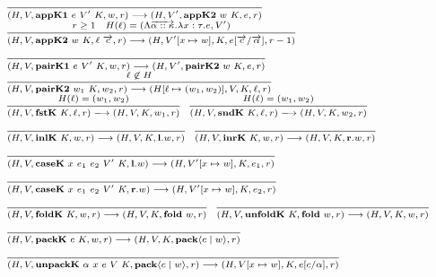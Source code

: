 \documentclass[fleqn]{article}
\begin{document}
\[
\scriptsize
\begin{array}{l}	
	\infer{(H,V,\mathbf{appK1}~e~V'~K,w,r) \longrightarrow (H,V',\mathbf{appK2}~w~K,e,r)}{\vspace{1em}} \\
	\infer{(H,V,\mathbf{appK2}~w~K,\ell~\overrightarrow{c},r) \longrightarrow (H,V'[x \mapsto w],K,e[\overrightarrow{c}/\overrightarrow{\alpha}],r-1)}{r \ge 1 & H(\ell) = (\Lambda \overrightarrow{\alpha::\kappa}. \lambda x:\tau.e,V')} \\
	\infer{(H,V,\mathbf{pairK1}~e~V'~K,w,r) \longrightarrow (H,V',\mathbf{pairK2}~w~K,e,r)}{\vspace{1em}} \\
	\infer{(H,V,\mathbf{pairK2}~w_1~K,w_2,r) \longrightarrow (H[\ell \mapsto (w_1,w_2)],V,K,\ell,r)}{\ell \not\in H} \\
	\infer{(H,V,\mathbf{fstK}~K,\ell,r) \longrightarrow (H,V,K,w_1,r)}{H(\ell) = (w_1,w_2)} \hspace{1em}
	\infer{(H,V,\mathbf{sndK}~K,\ell,r) \longrightarrow (H,V,K,w_2,r)}{H(\ell) = (w_1,w_2)} \\
	\infer{(H,V,\mathbf{inlK}~K,w,r) \longrightarrow (H,V,K,\mathbf{l}.w,r)}{\vspace{1em}} \hspace{1em}
	\infer{(H,V,\mathbf{inrK}~K,w,r) \longrightarrow (H,V,K,\mathbf{r}.w,r)}{\vspace{1em}} \\
	\infer{(H,V,\mathbf{caseK}~x~e_1~e_2~V'~K, \mathbf{l}.w) \longrightarrow (H,V'[x\mapsto w],K,e_1,r)}{\vspace{1em}} \\
	\infer{(H,V,\mathbf{caseK}~x~e_1~e_2~V'~K, \mathbf{r}.w) \longrightarrow (H,V'[x\mapsto w],K,e_2,r)}{\vspace{1em}} \\
	\infer{(H,V,\mathbf{foldK}~K,w,r) \longrightarrow (H,V,K,\mathbf{fold}~w,r)}{\vspace{1em}} \hspace{1em}
	\infer{(H,V,\mathbf{unfoldK}~K,\mathbf{fold}~w,r) \longrightarrow (H,V,K,w,r)}{\vspace{1em}} \\
	\infer{(H,V,\mathbf{packK}~c~K,w,r) \longrightarrow (H,V,K,\mathbf{pack} \langle c \mid w \rangle,r)}{\vspace{1em}} \\
	\infer{(H,V,\mathbf{unpackK}~\alpha~x~e~V~K,\mathbf{pack} \langle c \mid w \rangle,r) \longrightarrow (H,V[x \mapsto w],K,e[c/\alpha],r)}{\vspace{1em}} \\

\end{array}\]
\end{document}
